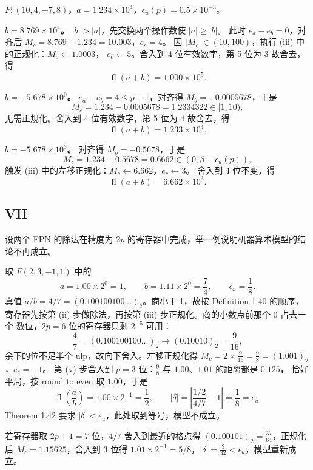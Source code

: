 \documentclass{article}
\newcommand{\fl}{\operatorname{fl}}
\begin{document}
\begin{solution}
  $F: (10, 4, -7, 8)$，$a = 1.234 \times 10^{4}$，$\epsilon_u(p) = 0.5 \times 10^{-3}$。

  \textbf{$b = 8.769 \times 10^{4}$。} $|b| > |a|$，先交换两个操作数使 $|a| \ge |b|$。
  此时 $e_a - e_b = 0$，对齐后 $M_c = 8.769 + 1.234 = 10.003$，$e_c = 4$。
  因 $|M_c| \in (10, 100)$，执行 (iii) 中的正规化：$M_c \leftarrow 1.0003$，
  $e_c \leftarrow 5$。舍入到 4 位有效数字，第 5 位为 3 故舍去，得
  \[
    \fl(a + b) = 1.000 \times 10^{5}.
  \]

  \textbf{$b = -5.678 \times 10^{0}$。} $e_a - e_b = 4 \le p + 1$，对齐得
  $M_b = -0.0005678$，于是
  \[
    M_c = 1.234 - 0.0005678 = 1.2334322 \in [1, 10),
  \]
  无需正规化。舍入到 4 位有效数字，第 5 位为 4 故舍去，得
  \[
    \fl(a + b) = 1.233 \times 10^{4}.
  \]

  \textbf{$b = -5.678 \times 10^{3}$。} 对齐得 $M_b = -0.5678$，于是
  \[
    M_c = 1.234 - 0.5678 = 0.6662 \in (0, \beta - \epsilon_u(p)),
  \]
  触发 (iii) 中的左移正规化：$M_c \leftarrow 6.662$，$e_c \leftarrow 3$。
  舍入到 4 位不变，得
  \[
    \fl(a + b) = 6.662 \times 10^{3}.
  \]
\end{solution}

\subsection*{VII}

设两个 FPN 的除法在精度为 $2p$ 的寄存器中完成，举一例说明机器算术模型的结论不再成立。

\begin{solution}
  取 $F(2, 3, -1, 1)$ 中的
  \[
    a = 1.00 \times 2^{0} = 1, \qquad b = 1.11 \times 2^{0} = \frac{7}{4},
    \qquad \epsilon_u = \frac{1}{8}.
  \]
  真值 $a/b = 4/7 = (0.100100100\ldots)_2$。商小于 1，故按 Definition 1.40 的顺序，
  寄存器先按第 (ii) 步做除法，再按第 (iii) 步正规化。商的小数点前那个 0 占去一个
  数位，$2p = 6$ 位的寄存器只剩 $2^{-5}$ 可用：
  \[
    \frac{4}{7} = (0.100100100\ldots)_2 \longrightarrow (0.10010)_2 = \frac{9}{16},
  \]
  余下的位不足半个 ulp，故向下舍入。左移正规化得
  $M_c = 2 \times \frac{9}{16} = \frac{9}{8} = (1.001)_2$，$e_c = -1$。
  第 (v) 步舍入到 $p = 3$ 位：$\frac{9}{8}$ 与 $1.00$、$1.01$ 的距离都是 $0.125$，
  恰好平局，按 round to even 取 $1.00$，于是
  \[
    \fl\left(\frac{a}{b}\right) = 1.00 \times 2^{-1} = \frac{1}{2},
    \qquad
    |\delta| = \left| \frac{1/2}{4/7} - 1 \right| = \frac{1}{8} = \epsilon_u.
  \]
  Theorem 1.42 要求 $|\delta| < \epsilon_u$，此处取到等号，模型不成立。

  若寄存器取 $2p + 1 = 7$ 位，$4/7$ 舍入到最近的格点得
  $(0.100101)_2 = \frac{37}{64}$，正规化后 $M_c = 1.15625$，舍入到 3 位得
  $1.01 \times 2^{-1} = 5/8$，$|\delta| = \frac{3}{32} < \epsilon_u$，模型重新成立。
\end{solution}
\end{document}
